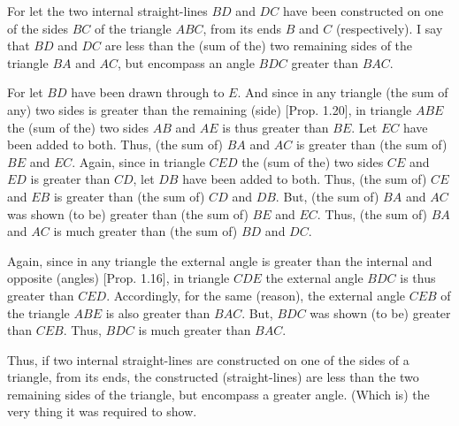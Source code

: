\begin{Parallel}{}{}
{\epsfysize=1.5in
\centerline{}

For let the two internal straight-lines $BD$ and $DC$ have been constructed on one of the sides $BC$ of the triangle $ABC$, from its ends $B$ and $C$ (respectively). I say that 
$BD$ and $DC$ are less than the (sum of the) two  remaining sides of the triangle
$BA$ and $AC$, but encompass an angle $BDC$ greater than $BAC$.

For let $BD$ have been drawn through to $E$. And since in any
triangle (the sum of any) two sides is greater than the remaining (side) [Prop. 1.20],
 in triangle $ABE$ the  (sum of the) two sides $AB$ and $AE$ is thus  greater than
$BE$. Let $EC$ have been added to both. Thus, (the sum of) $BA$ and $AC$ is greater
than (the sum of) $BE$ and $EC$.  Again, since in triangle $CED$ the (sum of the) two sides $CE$ and $ED$
is  greater than $CD$, let $DB$ have been added to both. Thus, 
(the sum of) $CE$ and $EB$ is greater than  (the sum of) $CD$ and $DB$. But, (the sum of) $BA$ and $AC$ was shown
(to be) greater than (the sum of) $BE$
 and $EC$. Thus, (the sum of) $BA$ and $AC$ is much greater than
(the sum of) $BD$ and $DC$.

Again, since in any  triangle the external angle 
is greater than the internal and opposite (angles) [Prop. 1.16],
 in triangle $CDE$ the external angle $BDC$ is thus greater
than $CED$.  Accordingly, for the same (reason),  the external angle $CEB$ of the
triangle $ABE$ is also greater than $BAC$. But, $BDC$ was shown (to be) 
greater
than $CEB$. Thus, $BDC$ is much greater than $BAC$.

Thus, if two internal straight-lines are constructed on one of the sides
of a triangle, from its ends, 
the constructed (straight-lines) are less than the two remaining 
sides of the triangle, but  encompass a greater angle. (Which is) the
very thing it was required to show.}
\end{Parallel}

